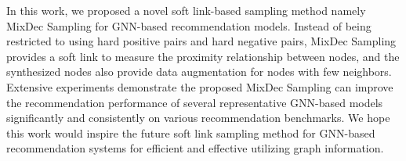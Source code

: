 In this work, we proposed a novel soft link-based sampling method namely MixDec Sampling for GNN-based recommendation models.
Instead of being restricted to using hard positive pairs and hard negative pairs, MixDec Sampling provides a soft link to measure the proximity relationship between nodes, and the synthesized nodes also provide data augmentation for nodes with few neighbors.
Extensive experiments demonstrate the proposed MixDec Sampling can improve the recommendation performance of
several representative GNN-based models significantly and consistently on various recommendation benchmarks.
We hope this work would inspire the future soft link sampling method for GNN-based recommendation systems  for
efficient and effective utilizing graph information.
